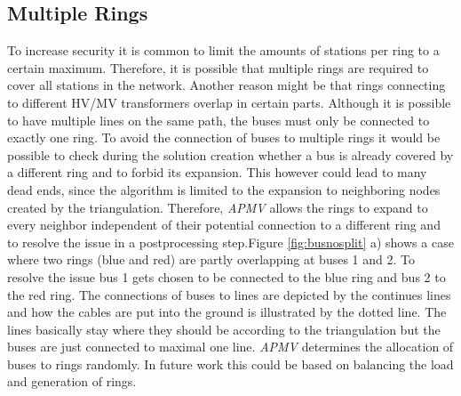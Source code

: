 \subsection{Multiple Rings}
To increase security it is common to limit the amounts of stations per ring to a certain maximum. Therefore, it is possible that multiple rings are required to cover all stations in the network. Another reason might be that rings connecting to different HV/MV transformers overlap in certain parts. Although it is possible to have multiple lines on the same path, the buses must only be connected to exactly one ring. To avoid the connection of buses to multiple rings it would be possible to check during the solution creation whether a bus is already covered by a different ring and to forbid its expansion. This however could lead to many dead ends, since the algorithm is limited to the expansion to neighboring nodes created by the triangulation. Therefore, \textit{APMV} allows the rings to expand to every neighbor independent of their potential connection to a different ring and to resolve the issue in a postprocessing step.Figure \ref{fig:busnosplit} a) shows a case where two rings (blue and red) are partly overlapping at buses 1 and 2. To resolve the issue bus 1 gets chosen to be connected to the blue ring and bus 2 to the red ring. The connections of buses to lines are depicted by the continues lines and how the cables are put into the ground is illustrated by the dotted line. The lines basically stay where they should be according to the triangulation but the buses are just connected to maximal one line. \textit{APMV} determines the allocation of buses to rings randomly. In future work this could be based on balancing the load and generation of rings.

